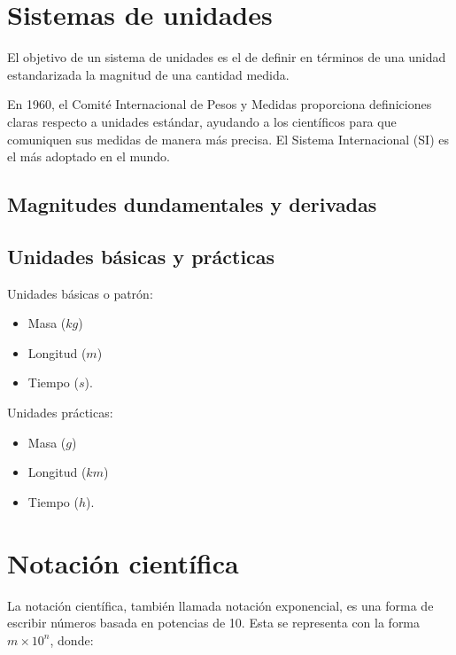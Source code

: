 \section{Sistemas de unidades}

El objetivo de un sistema de unidades es el de definir en términos de una unidad estandarizada la magnitud de una cantidad medida.

En 1960, el Comité Internacional de Pesos y Medidas proporciona definiciones claras respecto a unidades estándar, ayudando a los científicos para que comuniquen sus medidas de manera más precisa. El Sistema Internacional (SI) es el más adoptado en el mundo.

\subsection{Magnitudes dundamentales y derivadas}



    
    

\subsection{Unidades básicas y prácticas}



Unidades básicas o patrón:

\begin{itemize}
    \item Masa ($kg$)
    \item Longitud ($m$)
    \item Tiempo ($s$).
\end{itemize}

Unidades prácticas:

\begin{itemize}
    \item Masa ($g$)
    \item Longitud ($km$)
    \item Tiempo ($h$).
\end{itemize}

\section{Notación científica}

La notación científica, también llamada notación exponencial, es una forma de escribir números basada en potencias de 10. Esta se representa con la forma $m \times 10^{n}$, donde:

